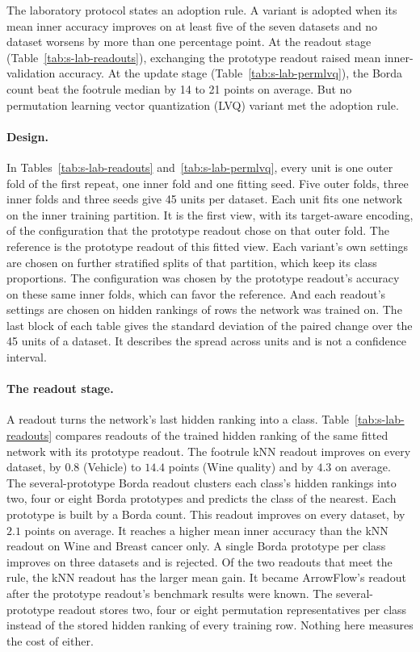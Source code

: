 The laboratory protocol states an adoption rule. A variant is adopted when its mean inner accuracy improves on at least five of the seven datasets and no dataset worsens by more than one percentage point. At the readout stage (Table~\ref{tab:s-lab-readouts}), exchanging the prototype readout raised mean inner-validation accuracy. At the update stage (Table~\ref{tab:s-lab-permlvq}), the Borda count beat the footrule median by 14 to 21 points on average. But no permutation learning vector quantization (LVQ) variant met the adoption rule.

\paragraph{Design.} In Tables~\ref{tab:s-lab-readouts} and~\ref{tab:s-lab-permlvq}, every unit is one outer fold of the first repeat, one inner fold and one fitting seed. Five outer folds, three inner folds and three seeds give 45 units per dataset. Each unit fits one network on the inner training partition. It is the first view, with its target-aware encoding, of the configuration that the prototype readout chose on that outer fold. The reference is the prototype readout of this fitted view. Each variant's own settings are chosen on further stratified splits of that partition, which keep its class proportions. The configuration was chosen by the prototype readout's accuracy on these same inner folds, which can favor the reference. And each readout's settings are chosen on hidden rankings of rows the network was trained on. The last block of each table gives the standard deviation of the paired change over the 45 units of a dataset. It describes the spread across units and is not a confidence interval.

\paragraph{The readout stage.} A readout turns the network's last hidden ranking into a class. Table~\ref{tab:s-lab-readouts} compares readouts of the trained hidden ranking of the same fitted network with its prototype readout. The footrule kNN readout improves on every dataset, by $0.8$ (Vehicle) to $14.4$ points (Wine quality) and by $4.3$ on average. The several-prototype Borda readout clusters each class's hidden rankings into two, four or eight Borda prototypes and predicts the class of the nearest. Each prototype is built by a Borda count. This readout improves on every dataset, by $2.1$ points on average. It reaches a higher mean inner accuracy than the kNN readout on Wine and Breast cancer only. A single Borda prototype per class improves on three datasets and is rejected. Of the two readouts that meet the rule, the kNN readout has the larger mean gain. It became ArrowFlow's readout after the prototype readout's benchmark results were known. The several-prototype readout stores two, four or eight permutation representatives per class instead of the stored hidden ranking of every training row. Nothing here measures the cost of either.

